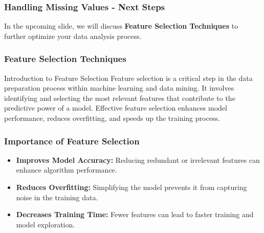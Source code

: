 \documentclass[aspectratio=169]{beamer}
\begin{document}
\begin{frame}[fragile]
    \frametitle{Handling Missing Values - Next Steps}
    In the upcoming slide, we will discuss \textbf{Feature Selection Techniques} to further optimize your data analysis process.
\end{frame}

\begin{frame}[fragile]
    \frametitle{Feature Selection Techniques}
    \begin{block}{Introduction to Feature Selection}
        Feature selection is a critical step in the data preparation process within machine learning and data mining. 
        It involves identifying and selecting the most relevant features that contribute to the predictive power of a model. 
        Effective feature selection enhances model performance, reduces overfitting, and speeds up the training process.
    \end{block}
\end{frame}

\begin{frame}[fragile]
    \frametitle{Importance of Feature Selection}
    \begin{itemize}
        \item \textbf{Improves Model Accuracy:} Reducing redundant or irrelevant features can enhance algorithm performance.
        \item \textbf{Reduces Overfitting:} Simplifying the model prevents it from capturing noise in the training data.
        \item \textbf{Decreases Training Time:} Fewer features can lead to faster training and model exploration.
    \end{itemize}
\end{frame}
\end{document}
